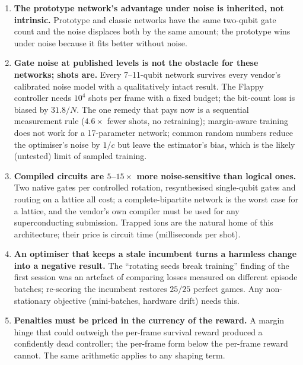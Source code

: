 \begin{enumerate}[leftmargin=*,itemsep=2pt]
\item \textbf{The prototype network's advantage under noise is inherited, not intrinsic.}
Prototype and classic networks have the same two-qubit gate count and the noise displaces both
by the same amount; the prototype wins under noise because it fits better without noise.

\item \textbf{Gate noise at published levels is not the obstacle for these networks; shots
are.}  Every 7--11-qubit network survives every vendor's calibrated noise model with a
qualitatively intact result.  The Flappy controller needs $10^4$ shots per frame with a fixed
budget; the bit-count loss is biased by $31.8/N$.  The one remedy that pays now is a sequential
measurement rule ($4.6\times$ fewer shots, no retraining); margin-aware training does not work
for a 17-parameter network; common random numbers reduce the optimiser's noise by $1/c$ but
leave the estimator's bias, which is the likely (untested) limit of sampled training.

\item \textbf{Compiled circuits are $5$--$15\times$ more noise-sensitive than logical ones.}
Two native gates per controlled rotation, resynthesised single-qubit gates and routing on a
lattice all cost; a complete-bipartite network is the worst case for a lattice, and the vendor's
own compiler must be used for any superconducting submission.  Trapped ions are the natural home
of this architecture; their price is circuit time (milliseconds per shot).

\item \textbf{An optimiser that keeps a stale incumbent turns a harmless change into a
negative result.}  The ``rotating seeds break training'' finding of the first session was an
artefact of comparing losses measured on different episode batches; re-scoring the incumbent
restores $25/25$ perfect games.  Any non-stationary objective (mini-batches, hardware drift) needs
this.

\item \textbf{Penalties must be priced in the currency of the reward.}  A margin hinge that
could outweigh the per-frame survival reward produced a confidently dead controller; the
per-frame form below the per-frame reward cannot.  The same arithmetic applies to any shaping
term.


\end{enumerate}

